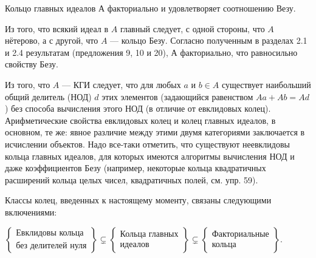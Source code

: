 \documentclass{mai_book}
\begin{document}
\begin{predl}
\hspace*{0.5cm}Кольцо главных идеалов А факториально и удовлетворяет  
соотношению Везу. 
\end{predl}
\newpage
\begin{myproof}
Из того, что всякий идеал в $A$ главный следует, с одной стороны, 
что $A$ нётерово, а с другой, что $A$ — кольцо Безу. Согласно  
полученным в разделах 2.1 и 2.4 результатам (предложения 9, 10 и 20), 
А факториально, что равносильно свойству Безу.
\end{myproof}

\begin{mynotice}
Из того, что $A$ — КГИ следует, что для любых $a$ 
и $b \in A$ существует наибольший общий делитель (НОД) $d$ этих 
элементов (задающийся равенством $Aa + Ab = Ad$) без способа 
вычисления этого НОД (в отличие от евклидовых колец).  
Арифметические свойства евклидовых колец и колец главных идеалов, 
в основном, те же: явное различие между этими двумя  
категориями заключается в исчислении объектов. Надо все-таки  
отметить, что существуют неевклидовы кольца главных идеалов, для 
которых имеются алгоритмы вычисления НОД и даже  
коэффициентов Безу (например, некоторые кольца квадратичных  
расширений кольца целых чисел, квадратичных полей, см. упр. 59).\newline 
\end{mynotice}
 
\begin{predl}
\hspace*{0.5cm}Классы колец, введенных к настоящему моменту, связаны  
следующими включениями: 
\end{predl}

$ \left\lbrace 
\begin{array}{l} 
\text{Евклидовы кольца} \\ 
\text{без делителей нуля} 
\end{array} 
\right\rbrace \subsetneq 
\left\lbrace 
\begin{array}{l} 
\text{Кольца главных} \\ 
\text{идеалов } 
\end{array} 
\right\rbrace \subsetneq 
\left\lbrace 
\begin{array}{l} 
\text{Факториальные} \\ 
\text{кольца} 
\end{array} 
\right\rbrace .$
\end{document}
